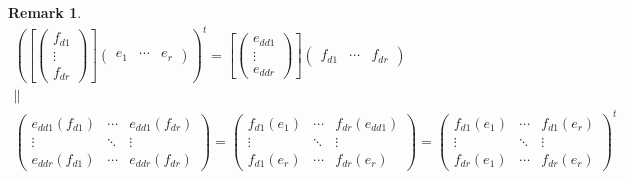 \documentclass[aps,preprint]{revtex4}
\newtheorem{remark}[theorem]{Remark}
\begin{document}
\begin{remark}
\begin{gather}
\left( \left[ \left( 
\begin{array}{c}
f_{d1} \\ 
\vdots \\ 
f_{dr}%
\end{array}%
\right) \right] \left( 
\begin{array}{ccc}
e_{1} & \cdots & e_{r}%
\end{array}%
\right) \right) ^{t}=\left[ \left( 
\begin{array}{c}
e_{dd1} \\ 
\vdots \\ 
e_{ddr}%
\end{array}%
\right) \right] \left( 
\begin{array}{ccc}
f_{d1} & \cdots & f_{dr}%
\end{array}%
\right) \\
\parallel \\
\left( 
\begin{array}{ccc}
e_{dd1}\left( f_{d1}\right) & \cdots & e_{dd1}\left( f_{dr}\right) \\ 
\vdots & \ddots & \vdots \\ 
e_{ddr}\left( f_{d1}\right) & \cdots & e_{ddr}\left( f_{dr}\right)%
\end{array}%
\right) =\left( 
\begin{array}{ccc}
f_{d1}\left( e_{1}\right) & \cdots & f_{dr}\left( e_{dd1}\right) \\ 
\vdots & \ddots & \vdots \\ 
f_{d1}\left( e_{r}\right) & \cdots & f_{dr}\left( e_{r}\right)%
\end{array}%
\right) =\left( 
\begin{array}{ccc}
f_{d1}\left( e_{1}\right) & \cdots & f_{d1}\left( e_{r}\right) \\ 
\vdots & \ddots & \vdots \\ 
f_{dr}\left( e_{1}\right) & \cdots & f_{dr}\left( e_{r}\right)%
\end{array}%
\right) ^{t}
\end{gather}
\end{remark}
\end{document}
